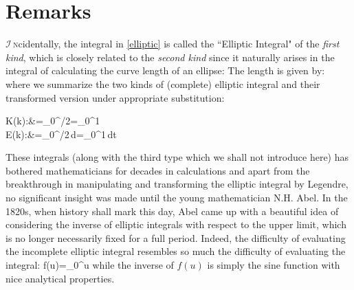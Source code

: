 \section{Remarks\hfill}
\lettrine[lines=2]{$\mathcal{I}\,$}\lowercase{n}cidentally, the integral in \eqref{elliptic} is called the ``Elliptic Integral" of the {\it first kind}, which is closely related to the {\it second kind}  since it naturally arises  in the integral of calculating the curve length of 
an ellipse\cite{borwein1987pi}:
\eq{
\begin{dcases}
y=b\cos\theta\\
x=a\sin\theta
	\end{dcases},\qquad\theta\in[0,2\pi)
}
The length is given by:
where we summarize the two kinds of (complete) elliptic integral and their transformed version under appropriate substitution\cite{borwein1987pi}:

\eq
{
K(k):&=\int_0^{\pi/2}=\int_0^{1}\\
E(k):&=\int_0^{\pi/2}\,d\theta=\int_0^{1}\,dt
}

These integrals (along with the third type which we shall not introduce here) has
bothered mathematicians for decades in calculations and apart from the 
breakthrough in manipulating and transforming the elliptic integral by Legendre,
no significant insight was made until the young mathematician N.H. Abel. In
the 1820s, when history shall mark this day, Abel came up with a beautiful idea of considering the inverse of elliptic integrals with respect to the upper limit, which is no longer necessarily fixed for a full period. Indeed, the difficulty of evaluating the incomplete elliptic integral resembles so much the difficulty of evaluating the integral:
\eq
{
f(u)=\int_0^u 
}
while the inverse of $f(u)$ is simply the sine function with nice analytical properties.


